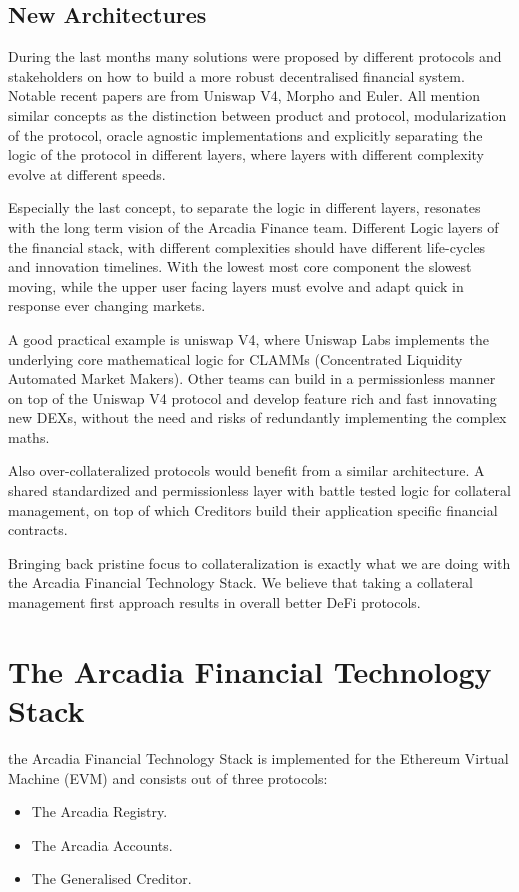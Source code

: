 \documentclass[sigconf,nonacm]{acmart}
\begin{document}
\subsection{New Architectures}
During the last months many solutions were proposed by different protocols and stakeholders on how to build a more robust decentralised financial system.
Notable recent papers are from Uniswap V4\cite{adams2023uniswap}, Morpho\cite{gontier2023morpho} and Euler\cite{euler2023protocols}.
All mention similar concepts as the distinction between product and protocol, modularization of the protocol, oracle agnostic implementations and explicitly separating the logic of the protocol in different layers,
where layers with different complexity evolve at different speeds.

Especially the last concept, to separate the logic in different layers, resonates with the long term vision of the Arcadia Finance team.
Different Logic layers of the financial stack, with different complexities should have different life-cycles and innovation timelines.
With the lowest most core component the slowest moving, while the upper user facing layers must evolve and adapt quick in response ever changing markets.

A good practical example is uniswap V4, where Uniswap Labs implements the underlying core mathematical logic for CLAMMs (Concentrated Liquidity Automated Market Makers).
Other teams can build in a permissionless manner on top of the Uniswap V4 protocol and develop feature rich and fast innovating new DEXs, without the need and risks of redundantly implementing the complex maths.

Also over-collateralized protocols would benefit from a similar architecture.
A shared standardized and permissionless layer with battle tested logic for collateral management, on top of which Creditors build their application specific financial contracts.

Bringing back pristine focus to collateralization is exactly what we are doing with the Arcadia Financial Technology Stack.
We believe that taking a collateral management first approach results in overall better DeFi protocols.


\section{The Arcadia Financial Technology Stack}

the Arcadia Financial Technology Stack is implemented for the Ethereum Virtual Machine (EVM) and consists out of three protocols:
\begin{itemize}
    \item The Arcadia Registry.
    \item The Arcadia Accounts.
    \item The Generalised Creditor.
\end{itemize}
\end{document}
